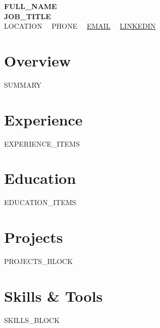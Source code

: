 \documentclass[10pt,letterpaper]{article}
\begin{document}
{\huge \textbf{{{FULL_NAME}}}} \\[4pt]
{\normalsize \textbf{{{JOB_TITLE}}}} \\[6pt]
\small
{{LOCATION}} \ \textbullet \ 
{{PHONE}} \ \textbullet \ 
\href{mailto:{{EMAIL}}}{{{EMAIL}}} \ \textbullet \ 
\href{https://{{LINKEDIN}}}{{{LINKEDIN}}}

\vspace{6pt}

\section{Overview}
{{SUMMARY}}

\section{Experience}
{{EXPERIENCE_ITEMS}}

\section{Education}
{{EDUCATION_ITEMS}}

\section{Projects}
{{PROJECTS_BLOCK}}

\section{Skills \& Tools}
{{SKILLS_BLOCK}}
\end{document}
